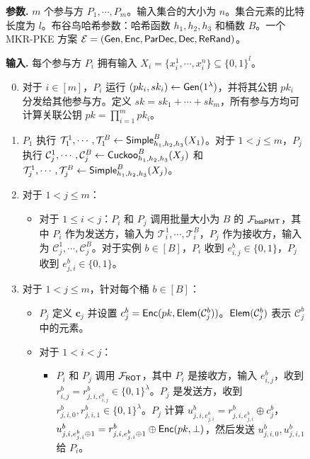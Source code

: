 \begin{figure}[!htbp]
\begin{framed}
\begin{minipage}[c]{\textwidth}
\begin{trivlist}
\item \textbf{参数.} $m$ 个参与方 $P_1, \cdots, P_m$。输入集合的大小为 $n$。集合元素的比特长度为 $l$。布谷鸟哈希参数：哈希函数 $h_1, h_2, h_3$ 和桶数 $B$。一个 MKR-PKE 方案 $\mathcal{E} = (\mathsf{Gen}, \mathsf{Enc}, \mathsf{ParDec}, \mathsf{Dec}, \mathsf{ReRand})$。
\item \textbf{输入.} 每个参与方 $P_i$ 拥有输入 $X_i = \{x_i^1,\cdots, x_i^n\} \subseteq \{0,1\}^l$。
\begin{enumerate} [itemsep=2pt,topsep=0pt,parsep=0pt]
\setcounter{enumi}{-1} %
\item 对于 $i \in [m]$，$P_i$ 运行 $(pk_i, sk_i) \gets \mathsf{Gen}(1^\lambda)$，并将其公钥 $pk_i$ 分发给其他参与方。定义 $sk = sk_1 + \cdots + sk_m$，所有参与方均可计算关联公钥 $pk= \prod_{i =1}^m pk_i$。
\item $P_1$ 执行 $\mathcal{T}_1^1, \cdots, \mathcal{T}_1^B \gets \mathsf{Simple}_{h_1,h_2,h_3}^B(X_1)$。对于 $1 < j \le m $，$P_j$ 执行 $\mathcal{C}_j^1, \cdots, \mathcal{C}_j^B \gets \mathsf{Cuckoo}_{h_1,h_2,h_3}^B(X_j)$ 和 $\mathcal{T}_j^1, \cdots, \mathcal{T}_j^B \gets \mathsf{Simple}_{h_1,h_2,h_3}^B(X_j)$。
\item 对于 $1 < j \le m$：
\begin{itemize} [itemsep=1pt,topsep=0pt,parsep=0pt,leftmargin=10pt]
  \item[-] 对于 $1 \le i < j$：$P_i$ 和 $P_j$ 调用批量大小为 $B$ 的 $\mathcal{F}_\mathsf{bssPMT}$，其中 $P_i$ 作为发送方，输入为 $\mathcal{T}_i^1, \cdots, \mathcal{T}_i^B$，$P_j$ 作为接收方，输入为 $\mathcal{C}_j^1, \cdots, \mathcal{C}_j^B$。对于实例 $b \in [B]$，$P_i$ 收到 $e_{i,j}^b \in \{0,1\}$，$P_j$ 收到 $e_{j,i}^b \in \{0,1\}$。
\end{itemize} 
\item 对于 $1 < j \le m$，针对每个桶 $b \in [B]$：
    \begin{itemize} [itemsep=2pt,topsep=0pt,parsep=0pt,leftmargin=10pt] 
    \item[-] $P_j$ 定义 $\textbf{c}_j$ 并设置 $c_j^b = \mathsf{Enc}(pk, \mathsf{Elem}(\mathcal{C}_j^b))$。$\mathsf{Elem}(\mathcal{C}_j^b)$ 表示 $\mathcal{C}_j^b$ 中的元素。
    \item[-] 对于 $1 < i < j$：
    \begin{itemize} [itemsep=2pt,topsep=0pt,parsep=0pt,leftmargin=10pt] 
    \item[-] $P_i$ 和 $P_j$ 调用 $\mathcal{F}_\mathsf{ROT}$，其中 $P_i$ 是接收方，输入 $e_{i,j}^b$，收到 $r_{i,j}^b = r_{j,i,e_{i,j}^b}^b \in \{0,1\}^ \lambda$。$P_j$ 是发送方，收到 $r_{j,i,0}^b, r_{j,i,1}^b \in \{0,1\}^ \lambda$。$P_j$ 计算 $u_{j,i,e_{j,i}^b}^b = r_{j,i,e_{j,i}^b}^b \oplus c_j^b$，$u_{j,i,e_{j,i}^b \oplus 1}^b = r_{j,i,e_{j,i}^b \oplus 1}^b \oplus \mathsf{Enc}(pk, \perp)$，然后发送 $u_{j,i,0}^b, u_{j,i,1}^b$ 给 $P_i$。 

\end{itemize}
\end{itemize}
\end{enumerate}
\end{trivlist}
\end{minipage}
\end{framed}
\end{figure}
